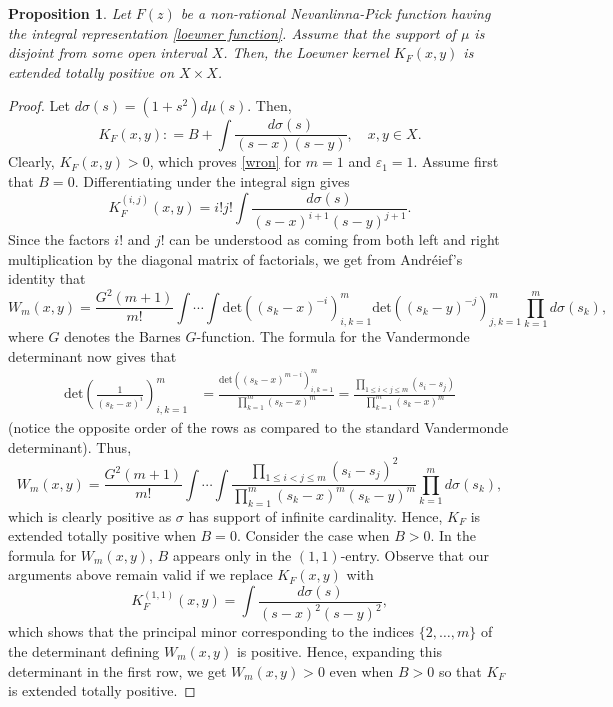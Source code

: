 \documentclass[twoside,a4paper]{amsart}
\renewcommand{\det}{\mathrm{det}}
\newtheorem{proposition}[theorem]{Proposition}
\theoremstyle{remark}
\begin{document}
\begin{proposition}
\label{prop:etp}
Let \( F(z) \) be a non-rational Nevanlinna-Pick function having the integral representation \eqref{loewner function}. Assume that the support of \( \mu \) is disjoint from some open interval \( X \). Then, the Loewner kernel \( K_F(x,y) \) is extended totally positive on \( X\times X \).
\end{proposition}
\begin{proof}
Let \( d\sigma(s) = (1+s^2)d\mu(s) \). Then,
\[
K_F(x,y): = B + \int\frac{d\sigma(s)}{(s-x)(s-y)}, \quad x,y\in X.
\] 
Clearly, $K_F(x,y)>0$, which proves \eqref{wron} for \( m=1\) and $\varepsilon_1=1$.  Assume first that \( B= 0 \).  Differentiating under the integral sign gives
\[
K_F^{(i,j)}(x,y) =  i!j!\int\frac{d\sigma(s)}{(s-x)^{i+1}(s-y)^{j+1}}.
\]
Since the factors \( i! \) and \( j! \) can be understood as coming from both left and right multiplication by the diagonal matrix of factorials, we get from Andr\'eief's identity that
\[
W_m(x,y) = \frac{G^2(m+1)}{m!} \int\cdots\int \det\left( (s_k-x)^{-i} \right)_{i,k=1}^m \det\left( (s_k-y)^{-j} \right)_{j,k=1}^m  \prod_{k=1}^m d\sigma(s_k),
\]
where \( G\) denotes the Barnes \( G \)-function. The formula for the Vandermonde determinant now gives that
\begin{align}
\det\left( \frac1{(s_k-x)^i} \right)_{i,k=1}^m & = \frac{\det\left( (s_k-x)^{m-i} \right)_{i,k=1}^m}{\prod_{k=1}^m (s_k-x)^m} = \frac{\prod_{1\leq i<j\leq m}(s_i-s_j)}{\prod_{k=1}^m (s_k-x)^m}
\end{align}
(notice the opposite order of the rows as compared to the standard Vandermonde determinant). Thus,
\[
W_m(x,y) = \frac{G^2(m+1)}{m!} \int\cdots\int\frac{\prod_{1\leq i<j\leq m}(s_i-s_j)^2}{\prod_{k=1}^m (s_k-x)^m(s_k-y)^m}\prod_{k=1}^m d\sigma(s_k),
\]
which is clearly positive as \( \sigma \) has support of infinite cardinality. Hence,  $K_F$ is extended totally positive  when $B=0$. Consider the case when $B>0$. In the formula for $W_m(x,y)$, $B$ appears only in the \( (1,1) \)-entry.  Observe that our arguments above remain valid if we replace \( K_F(x,y) \) with
\[
K_F^{(1,1)}(x,y) = \int\frac{d\sigma(s)}{(s-x)^2(s-y)^2},
\]
which shows that the principal minor corresponding to the indices \( \{2,\ldots,m\} \) of the determinant defining $W_m(x,y)$  is positive. Hence, expanding this determinant in the first row, we get  $W_m(x,y)>0$ even when \( B>0 \) so that $K_F$ is extended totally positive.
\end{proof}
\end{document}
